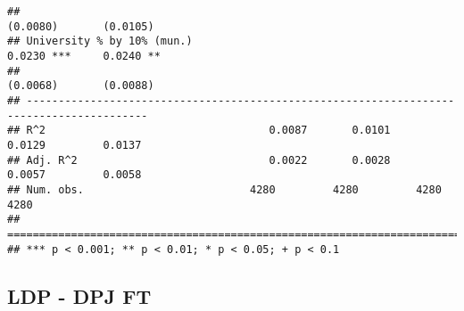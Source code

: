 \documentclass[
]{article}
\begin{document}
\begin{verbatim}
##                                                                (0.0080)       (0.0105)   
## University % by 10% (mun.)                                      0.0230 ***     0.0240 ** 
##                                                                (0.0068)       (0.0088)   
## -----------------------------------------------------------------------------------------
## R^2                                   0.0087       0.0101       0.0129         0.0137    
## Adj. R^2                              0.0022       0.0028       0.0057         0.0058    
## Num. obs.                          4280         4280         4280           4280         
## =========================================================================================
## *** p < 0.001; ** p < 0.01; * p < 0.05; + p < 0.1
\end{verbatim}

\hypertarget{ldp---dpj-ft-5}{%
\subsection{LDP - DPJ FT}\label{ldp---dpj-ft-5}}
\end{document}
